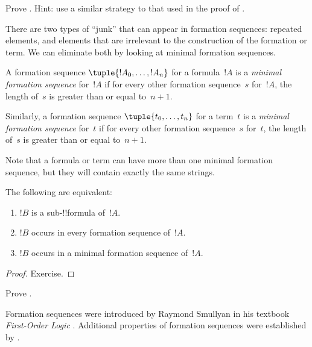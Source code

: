 \documentclass[../../../include/open-logic-section]{subfiles}
\begin{document}
\begin{prob}
Prove .
Hint: use a similar strategy to that used in the proof of
.
\end{prob}

There are two types of ``junk'' that can appear in formation
sequences: repeated elements, and elements that are irrelevant
to the construction of the formation or term. We can eliminate
both by looking at minimal formation sequences.

\begin{defn}
A formation sequence $\tuple{!A_0, \ldots, !A_n}$ for a
formula~$!A$ is a \emph{minimal formation sequence} for~$!A$
if for every other formation sequence~$s$ for~$!A$,
the length of~$s$ is greater than or equal to~$n+1$.

Similarly, a formation sequence $\tuple{t_0, \ldots, t_n}$
for a term~$t$ is a \emph{minimal formation sequence}
for~$t$ if for every other formation sequence~$s$ for~$t$,
the length of~$s$ is greater than or equal to~$n+1$.
\end{defn}

Note that a formula or term can have more than one minimal
formation sequence, but they will contain exactly the same
strings.

\begin{prop}
The following are equivalent:
\begin{enumerate}
    \item $!B$ is a sub-!!{formula} of~$!A$.
    \item $!B$ occurs in every formation sequence of~$!A$.
    \item $!B$ occurs in a minimal formation sequence of~$!A$.
\end{enumerate}
\end{prop}

\begin{proof}
Exercise.
\end{proof}

\begin{prob}
Prove .
\end{prob}

\begin{history}
Formation sequences were introduced by Raymond Smullyan in his
textbook \emph{First-Order Logic} \citep{Smullyan1968}.
Additional properties of formation sequences were established by
\citet{Zuckerman1973}.
\end{history}
\end{document}
